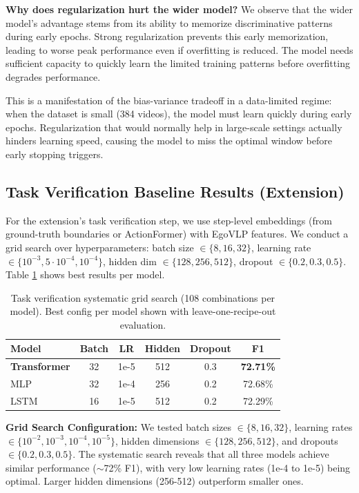 \documentclass[10pt,twocolumn,letterpaper]{article}
\begin{document}
\textbf{Why does regularization hurt the wider model?} We observe that the wider model's advantage stems from its ability to memorize discriminative patterns during early epochs. Strong regularization prevents this early memorization, leading to worse peak performance even if overfitting is reduced. The model needs sufficient capacity to quickly learn the limited training patterns before overfitting degrades performance.

This is a manifestation of the bias-variance tradeoff in a data-limited regime: when the dataset is small (384 videos), the model must learn quickly during early epochs. Regularization that would normally help in large-scale settings actually hinders learning speed, causing the model to miss the optimal window before early stopping triggers.

\subsection{Task Verification Baseline Results (Extension)}

For the extension's task verification step, we use step-level embeddings (from ground-truth boundaries or ActionFormer) with EgoVLP features. We conduct a grid search over hyperparameters: batch size $\in \{8, 16, 32\}$, learning rate $\in \{10^{-3}, 5\cdot10^{-4}, 10^{-4}\}$, hidden dim $\in \{128, 256, 512\}$, dropout $\in \{0.2, 0.3, 0.5\}$. Table \ref{tab:verification} shows best results per model.

\begin{table}[h]
\centering
\caption{Task verification systematic grid search (108 combinations per model). Best config per model shown with leave-one-recipe-out evaluation.}
\label{tab:verification}
\begin{tabular}{lccccc}
\toprule
Model & Batch & LR & Hidden & Dropout & F1 \\
\midrule
\textbf{Transformer} & 32 & 1e-5 & 512 & 0.3 & \textbf{72.71\%} \\
MLP & 32 & 1e-4 & 256 & 0.2 & 72.68\% \\
LSTM & 16 & 1e-5 & 512 & 0.2 & 72.29\% \\
\bottomrule
\end{tabular}
\end{table}

\textbf{Grid Search Configuration:} We tested batch sizes $\in \{8, 16, 32\}$, learning rates $\in \{10^{-2}, 10^{-3}, 10^{-4}, 10^{-5}\}$, hidden dimensions $\in \{128, 256, 512\}$, and dropouts $\in \{0.2, 0.3, 0.5\}$. The systematic search reveals that all three models achieve similar performance ($\sim$72\% F1), with very low learning rates (1e-4 to 1e-5) being optimal. Larger hidden dimensions (256-512) outperform smaller ones.
\end{document}
